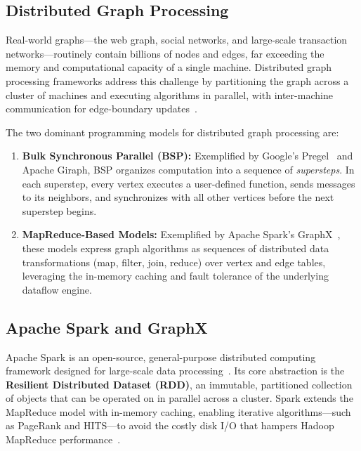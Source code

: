 \subsection{Distributed Graph Processing}
\label{subsec:distributed_graph}

Real-world graphs---the web graph, social networks, and large-scale transaction networks---routinely contain billions of nodes and edges, far exceeding the memory and computational capacity of a single machine. Distributed graph processing frameworks address this challenge by partitioning the graph across a cluster of machines and executing algorithms in parallel, with inter-machine communication for edge-boundary updates~\cite{spark_graphx, pregel2010}.

The two dominant programming models for distributed graph processing are:

\begin{enumerate}
    \item \textbf{Bulk Synchronous Parallel (BSP):} Exemplified by Google's Pregel~\cite{pregel2010} and Apache Giraph, BSP organizes computation into a sequence of \textit{supersteps}. In each superstep, every vertex executes a user-defined function, sends messages to its neighbors, and synchronizes with all other vertices before the next superstep begins.

    \item \textbf{MapReduce-Based Models:} Exemplified by Apache Spark's GraphX~\cite{spark_graphx}, these models express graph algorithms as sequences of distributed data transformations (map, filter, join, reduce) over vertex and edge tables, leveraging the in-memory caching and fault tolerance of the underlying dataflow engine.
\end{enumerate}


\subsection{Apache Spark and GraphX}
\label{subsec:spark_graphx}

Apache Spark is an open-source, general-purpose distributed computing framework designed for large-scale data processing~\cite{spark_graphx}. Its core abstraction is the \textbf{Resilient Distributed Dataset (RDD)}, an immutable, partitioned collection of objects that can be operated on in parallel across a cluster. Spark extends the MapReduce model with in-memory caching, enabling iterative algorithms---such as PageRank and HITS---to avoid the costly disk I/O that hampers Hadoop MapReduce performance~\cite{spark_graphx}.


